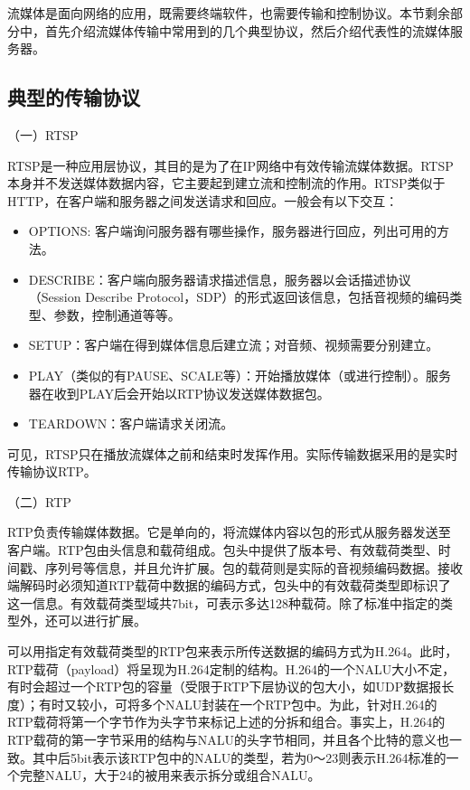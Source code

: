 流媒体是面向网络的应用，既需要终端软件，也需要传输和控制协议。本节剩余部分中，首先介绍流媒体传输中常用到的几个典型协议，然后介绍代表性的流媒体服务器。

\subsection{典型的传输协议}
\label{subsec:protocols}

（一）RTSP

RTSP是一种应用层协议，其目的是为了在IP网络中有效传输流媒体数据。RTSP本身并不发送媒体数据内容，它主要起到建立流和控制流的作用。RTSP类似于HTTP，在客户端和服务器之间发送请求和回应。一般会有以下交互：
\begin{itemize}
\item OPTIONS: 客户端询问服务器有哪些操作，服务器进行回应，列出可用的方法。
\item DESCRIBE：客户端向服务器请求描述信息，服务器以会话描述协议（Session Describe Protocol，SDP）的形式返回该信息，包括音视频的编码类型、参数，控制通道等等。
\item SETUP：客户端在得到媒体信息后建立流；对音频、视频需要分别建立。
\item PLAY（类似的有PAUSE、SCALE等）：开始播放媒体（或进行控制）。服务器在收到PLAY后会开始以RTP协议发送媒体数据包。
\item TEARDOWN：客户端请求关闭流。
\end{itemize}

可见，RTSP只在播放流媒体之前和结束时发挥作用。实际传输数据采用的是实时传输协议RTP。

（二）RTP

RTP负责传输媒体数据。它是单向的，将流媒体内容以包的形式从服务器发送至客户端。RTP包由头信息和载荷组成\supercite{RTP}。包头中提供了版本号、有效载荷类型、时间戳、序列号等信息，并且允许扩展。包的载荷则是实际的音视频编码数据。接收端解码时必须知道RTP载荷中数据的编码方式，包头中的有效载荷类型即标识了这一信息。有效载荷类型域共7bit，可表示多达128种载荷。除了标准中指定的类型外，还可以进行扩展。

可以用指定有效载荷类型的RTP包来表示所传送数据的编码方式为H.264。此时，RTP载荷（payload）将呈现为H.264定制的结构\supercite{RTP-H.264}。H.264的一个NALU大小不定，有时会超过一个RTP包的容量（受限于RTP下层协议的包大小，如UDP数据报长度）；有时又较小，可将多个NALU封装在一个RTP包中。为此，针对H.264的RTP载荷将第一个字节作为头字节来标记上述的分拆和组合。事实上，H.264的RTP载荷的第一字节采用的结构与NALU的头字节相同，并且各个比特的意义也一致。其中后5bit表示该RTP包中的NALU的类型，若为0～23则表示H.264标准的一个完整NALU，大于24的被用来表示拆分或组合NALU。


